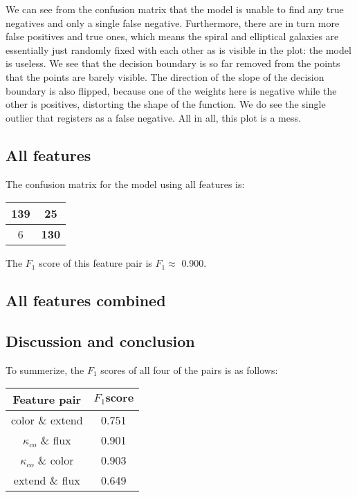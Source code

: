 We can see from the confusion matrix that the model is unable to find any true negatives and only a single false negative. Furthermore, there are in turn more false positives and true ones, which means the spiral and elliptical galaxies are essentially just randomly fixed with each other as is visible in the plot: the model is useless. We see that the decision boundary is so far removed from the points that the points are barely visible. The direction of the slope of the decision boundary is also flipped, because one of the weights here is negative while the other is positives, distorting the shape of the function. We do see the single outlier that registers as a false negative. All in all, this plot is a mess. 

\subsection{All features}

The confusion matrix for the model using all features is:

\begin{table}[!h]
\centering
\begin{tabular}{c|c}
\textbf{139} & 25\\ \hline
6 &   \textbf{130}\\
\end{tabular}
\end{table}

The $F_1$ score of this feature pair is $F_1 \approx$ 0.900. 

\subsection*{All features combined}

\subsection*{Discussion and conclusion}

To summerize, the $F_1$ scores of all four of the pairs is as follows:\\ 

\begin{table}[!h]
\centering
\begin{tabular}{c|c}
\textbf{Feature pair} & $F_1 \textbf{score}$\\ \hline 
color \& extend &   0.751\\ \hline 
$\kappa_{co}$ \& flux &     0.901\\ \hline 
$\kappa_{co}$ \& color &     0.903\\ \hline
extend \& flux &     0.649
\end{tabular}
\end{table}

